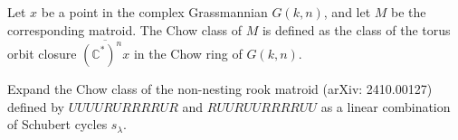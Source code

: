 Let $x$ be a point in the complex Grassmannian $G(k,n)$, and let $M$ be the corresponding matroid. The Chow class of $M$ is defined as the class of the torus orbit closure $\overline{(\mathbb C^*)^n x}$ in the Chow ring of $G(k,n)$.

Expand the Chow class of the non-nesting rook matroid (arXiv: 2410.00127) defined by $UUUURURRRRUR$ and $RUURUURRRRUU$ as a linear combination of Schubert cycles $s_{\lambda}$.
